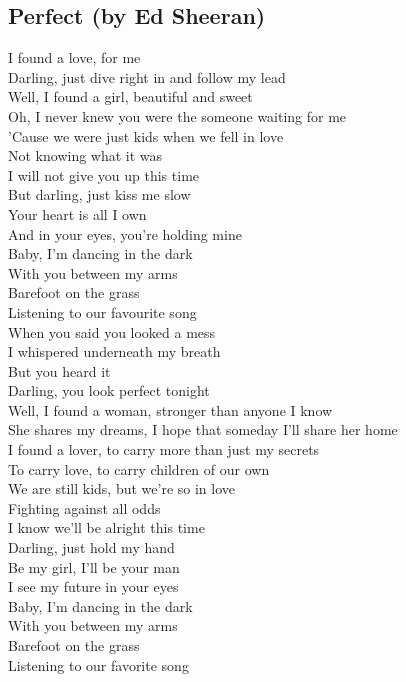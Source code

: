 \documentclass[]{article} %
\begin{document}
\subsection*{Perfect (by Ed Sheeran)}
\thispagestyle{myheadings}
I found a love, for me\\
Darling, just dive right in and follow my lead\\
Well, I found a girl, beautiful and sweet\\
Oh, I never knew you were the someone waiting for me\\
'Cause we were just kids when we fell in love\\
Not knowing what it was\\
I will not give you up this time\\
But darling, just kiss me slow\\
Your heart is all I own\\
And in your eyes, you're holding mine\\
Baby, I'm dancing in the dark\\
With you between my arms\\
Barefoot on the grass\\
Listening to our favourite song\\
When you said you looked a mess\\
I whispered underneath my breath\\
But you heard it\\
Darling, you look perfect tonight\\
Well, I found a woman, stronger than anyone I know\\
She shares my dreams, I hope that someday I'll share her home\\
I found a lover, to carry more than just my secrets\\
To carry love, to carry children of our own\\
We are still kids, but we're so in love\\
Fighting against all odds\\
I know we'll be alright this time\\
Darling, just hold my hand\\
Be my girl, I'll be your man\\
I see my future in your eyes\\
Baby, I'm dancing in the dark\\
With you between my arms\\
Barefoot on the grass\\
Listening to our favorite song\\
\end{document}
